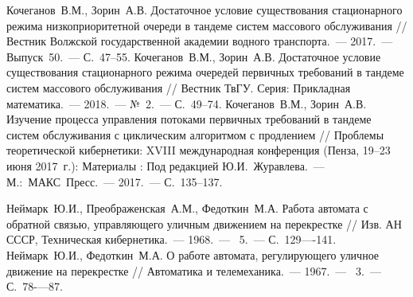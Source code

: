 \documentclass[a4paper,12pt,russian]{extarticle}
\newcommand{\No}{\textnumero}
\begin{document}
\begin{thebibliography}{99}
 Кочеганов~В.М., Зорин~А.В. Достаточное условие существования стационарного режима низкоприоритетной очереди в тандеме систем массового обслуживания // Вестник Волжской государственной академии водного транспорта.~--- 2017.~--- Выпуск~50.~--- С.~47--55.
 Кочеганов~В.М., Зорин~А.В. Достаточное условие существования стационарного режима очередей первичных требований в тандеме систем массового обслуживания // Вестник ТвГУ. Серия: Прикладная математика.~--- 2018.~--- №~2.~--- С.~49--74.
 Кочеганов~В.М., Зорин~А.В. Изучение процесса управления потоками первичных требований в тандеме систем обслуживания с циклическим алгоритмом с продлением // Проблемы теоретической кибернетики: XVIII международная конференция (Пенза, 19--23 июня 2017~г.): Материалы : Под редакцией Ю.И.~Журавлева.~--- М.:~МАКС~Пресс.~--- 2017.~--- С.~135--137.

 Неймарк~Ю.И., Преображенская~А.М., Федоткин~М.А. Работа автомата с обратной связью, управляющего уличным движением на перекрестке // Изв. АН СССР, Техническая кибернетика.~--- 1968.~--- \No{}~5.~--- С.~129—-141. 
 Неймарк~Ю.И., Федоткин~М.А. О работе автомата, регулирующего уличное движение на перекрестке // Автоматика и телемеханика.~--- 1967.~--- \No{}~3.~--- С.~78-—87.  


\end{thebibliography}
\end{document}
